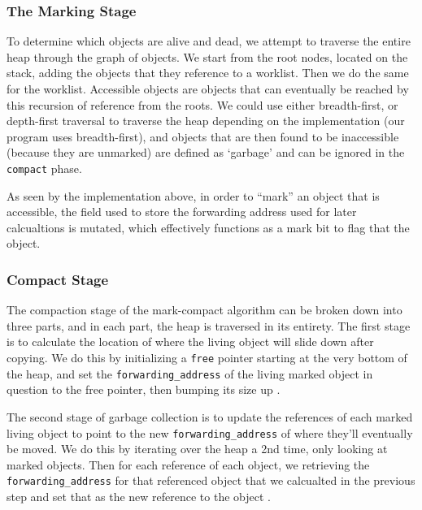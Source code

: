\documentclass[index]{subfiles}
\begin{document}
\subsubsection{The Marking Stage}

To determine which objects are alive and dead, we attempt to traverse the entire heap through the graph of objects. We start from the root nodes, located on the stack\cites[3..~Marking]{redhat_openjdk}[Chapter~3]{gc_handbook}, adding the objects that they reference to a worklist. Then we do the same for the worklist. Accessible objects are objects that can eventually be reached by this recursion of reference from the roots. We could use either breadth-first, or depth-first traversal to traverse the heap depending on the implementation (our program uses breadth-first), and objects that are then found to be inaccessible (because they are unmarked) are defined as `garbage' and can be ignored in the \verb+compact+ phase.

As seen by the implementation above, in order to ``mark'' an object that is accessible, the field used to store the forwarding address used for later calcualtions is mutated, which effectively functions as a mark bit to flag that the object. \cite[Chapter~1]{gc_handbook}


\subsubsection{Compact Stage}

The compaction stage of the mark-compact algorithm can be broken down into three parts, and in each part, the heap is traversed in its entirety. The first stage is to calculate the location of where the living object will slide down after copying. We do this by initializing a \verb+free+ pointer starting at the very bottom of the heap, and set the \verb+forwarding_address+ of the living marked object in question to the free pointer, then bumping its size up \cites[Chapter~3]{gc_handbook}[Sections~3.3-3.5]{redhat_openjdk}.


The second stage of garbage collection is to update the references of each marked living object to point to the new \verb+forwarding_address+ of where they'll eventually be moved. We do this by iterating over the heap a 2nd time, only looking at marked objects. Then for each reference of each object, we retrieving the \verb+forwarding_address+ for that referenced object that we calcualted in the previous step and set that as the new reference to the object \cites[Chapter 3]{gc_handbook}[Sec.~3.4]{redhat_openjdk}.
\end{document}
